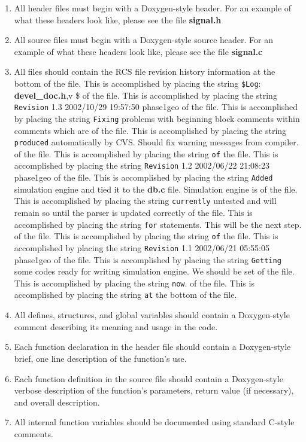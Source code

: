 \begin{Desc}
\begin{enumerate}
\item 
All header files must begin with a Doxygen-style header. For an example of what these  headers look like, please see the file {\bf signal.h}\item 
All source files must begin with a Doxygen-style source header. For an example of what these headers look like, please see the file {\bf signal.c}\item 
All files should contain the RCS file revision history information at the bottom of the file. This is accomplished by placing the string {\tt \$Log}: {\bf devel\_\-doc.h},v \$ of the file. This is accomplished by placing the string {\tt Revision} 1.3 2002/10/29 19:57:50 phase1geo of the file. This is accomplished by placing the string {\tt Fixing} problems with beginning block comments within comments which are of the file. This is accomplished by placing the string {\tt produced} automatically by CVS. Should fix warning messages from compiler. of the file. This is accomplished by placing the string {\tt of} the file. This is accomplished by placing the string {\tt Revision} 1.2 2002/06/22 21:08:23 phase1geo of the file. This is accomplished by placing the string {\tt Added} simulation engine and tied it to the {\bf db.c} file. Simulation engine is of the file. This is accomplished by placing the string {\tt currently} untested and will remain so until the parser is updated correctly of the file. This is accomplished by placing the string {\tt for} statements. This will be the next step. of the file. This is accomplished by placing the string {\tt of} the file. This is accomplished by placing the string {\tt Revision} 1.1 2002/06/21 05:55:05 phase1geo of the file. This is accomplished by placing the string {\tt Getting} some codes ready for writing simulation engine. We should be set of the file. This is accomplished by placing the string {\tt now}. of the file. This is accomplished by placing the string {\tt at} the bottom of the file.\item 
All defines, structures, and global variables should contain a Doxygen-style comment  describing its meaning and usage in the code.\item 
Each function declaration in the header file should contain a Doxygen-style brief, one line description of the function's use.\item 
Each function definition in the source file should contain a Doxygen-style verbose description of the function's parameters, return value (if necessary), and overall description.\item 
All internal function variables should be documented using standard C-style comments.\end{enumerate}
\end{Desc}


